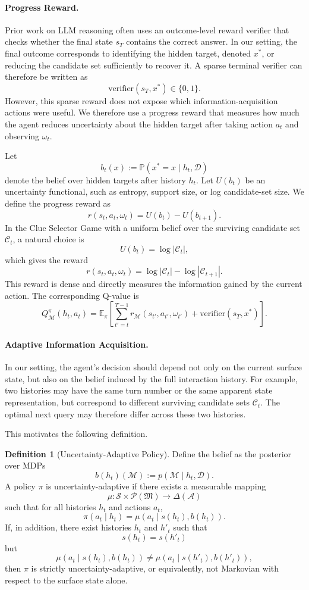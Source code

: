 \documentclass[11pt]{article}
\theoremstyle{plain}
\theoremstyle{definition}
\newtheorem{definition}[theorem]{Definition}
\theoremstyle{remark}
\begin{document}
\paragraph{Progress Reward.}
Prior work on LLM reasoning often uses an outcome-level reward verifier that
checks whether the final state $s_T$ contains the correct answer. In our setting,
the final outcome corresponds to identifying the hidden target, denoted
$x^*$, or reducing the candidate set sufficiently to recover it. A sparse
terminal verifier can therefore be written as
\[
\mathrm{verifier}(s_T,x^*)
\in \{0,1\}.
\]
However, this sparse reward does not expose which information-acquisition
actions were useful. We therefore use a progress reward that measures how much
the agent reduces uncertainty about the hidden target after taking action
$a_t$ and observing $\omega_t$.

Let
\[
b_t(x) := \mathbb{P}(x^*=x\mid h_t,\mathcal{D})
\]
denote the belief over hidden targets after history $h_t$. Let $U(b_t)$ be an
uncertainty functional, such as entropy, support size, or log candidate-set
size. We define the progress reward as
\[
r(s_t,a_t,\omega_t)
=
U(b_t)-U(b_{t+1}).
\]
In the Clue Selector Game with a uniform belief over the surviving candidate
set $\mathcal{C}_t$, a natural choice is
\[
U(b_t)=\log |\mathcal{C}_t|,
\]
which gives the reward
\[
r(s_t,a_t,\omega_t)
=
\log |\mathcal{C}_t|
-
\log |\mathcal{C}_{t+1}|.
\]
This reward is dense and directly measures the information gained by the
current action. The corresponding Q-value is
\[
Q^{\pi}_{\mathcal{M}}(h_t,a_t)
=
\mathbb{E}_{\pi}
\left[
\sum_{t'=t}^{T-1}
r_{\mathcal{M}}(s_{t'},a_{t'},\omega_{t'})
+
\mathrm{verifier}(s_T,x^*)
\right].
\]

\paragraph{Adaptive Information Acquisition.}
In our setting, the agent's decision should depend not only on the current
surface state, but also on the belief induced by the full interaction history.
For example, two histories may have the same turn number or the same apparent
state representation, but correspond to different surviving candidate sets
$\mathcal{C}_t$. The optimal next query may therefore differ across these two
histories.

This motivates the following definition.

\begin{definition}[Uncertainty-Adaptive Policy]
Define the belief as the posterior over MDPs
\[
b(h_t)(\mathcal{M})
:=
p(\mathcal{M}\mid h_t,\mathcal{D}).
\]
A policy $\pi$ is uncertainty-adaptive if there exists a measurable mapping
\[
\mu : \mathcal{S}\times \mathcal{P}(\mathfrak{M}) \rightarrow \Delta(\mathcal{A})
\]
such that for all histories $h_t$ and actions $a_t$,
\[
\pi(a_t\mid h_t)
=
\mu(a_t\mid s(h_t),b(h_t)).
\]
If, in addition, there exist histories $h_t$ and $h'_t$ such that
\[
s(h_t)=s(h'_t)
\]
but
\[
\mu(a_t\mid s(h_t),b(h_t))
\neq
\mu(a_t\mid s(h'_t),b(h'_t)),
\]
then $\pi$ is strictly uncertainty-adaptive, or equivalently, not Markovian
with respect to the surface state alone.
\end{definition}
\end{document}
